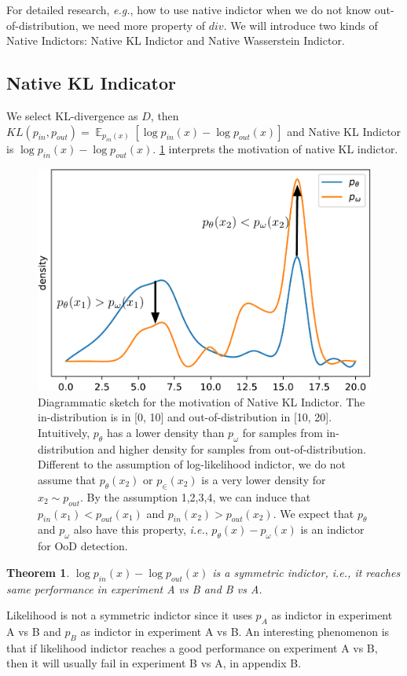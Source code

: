 \documentclass[letterpaper]{article} %
\newtheorem{theorem}{Theorem}
\newcommand{\IE}{\textit{i.e.}, }
\newcommand{\EG}{\textit{e.g.}, }
\newcommand{\E}{\operatorname{\mathbb{E}}}
\newcommand{\pin}{p_{in}}
\newcommand{\pout}{p_{out}}
\begin{document}
For detailed research, \EG how to use native indictor when we do not know out-of-distribution, we need more property of $div$. 
We will introduce two kinds of Native Indictors: Native KL Indictor and Native Wasserstein Indictor. 

\subsection{Native KL Indicator}
We select KL-divergence as $D$, then $KL(\pin, \pout) = \E_{\pin(x)} [\log \pin(x) - \log \pout(x)]$ and Native KL Indictor is $\log \pin(x) - \log \pout(x)$. \cref{fig3} interprets the motivation of native KL indictor. 
\begin{figure}
	\center
	\includegraphics[width=0.9\columnwidth]{diagram}
	\caption{Diagrammatic sketch for the motivation of Native KL Indictor. The in-distribution is in [0, 10] and out-of-distribution in [10, 20]. Intuitively, $p_\theta$ has a lower density than $p_\omega$ for samples from in-distribution and higher density for samples from out-of-distribution. 
	Different to the assumption of log-likelihood indictor, we do not assume that $p_\theta(x_2)$ or $p_\in(x_2)$ is a very lower density for $x_2 \sim \pout$. By the assumption 1,2,3,4, we can induce that $\pin(x_1) < \pout(x_1)$ and $\pin(x_2) > \pout(x_2)$. We expect that $p_\theta$ and $p_\omega$ also have this property, \IE $p_\theta(x) - p_\omega(x)$ is an indictor for OoD detection. }
	\label{fig3}
\end{figure}

\begin{theorem}\label{thm1}
	$\log \pin(x) - \log \pout(x)$ is a symmetric indictor, \IE it reaches same performance in experiment A vs B and B vs A.  
\end{theorem}
Likelihood is not a symmetric indictor since it uses $p_A$ as indictor in experiment A vs B and $p_B$ as indictor in experiment A vs B. An interesting phenomenon is that if likelihood indictor reaches a good performance on experiment A vs B, then it will usually fail in experiment B vs A, in appendix B. 
\end{document}

